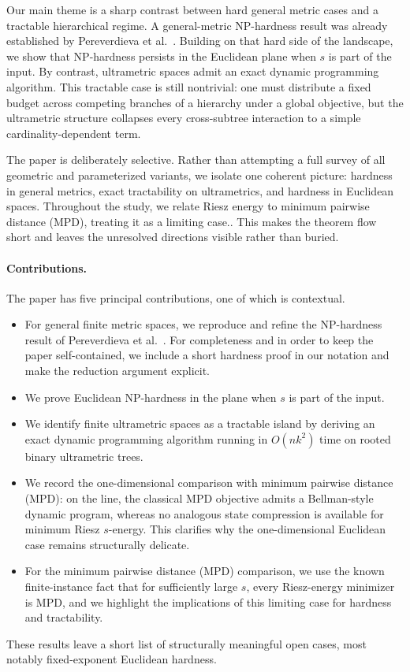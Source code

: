 \documentclass[11pt]{article}
\begin{document}
Our main theme is a sharp contrast between hard general metric cases and a tractable hierarchical regime. A general-metric NP-hardness result was already established by Pereverdieva et al.~\cite{PereverdievaEtAl2025}. Building on that hard side of the landscape, we show that NP-hardness persists in the Euclidean plane when $s$ is part of the input. By contrast, ultrametric spaces admit an exact dynamic programming algorithm. This tractable case is still nontrivial: one must distribute a fixed budget across competing branches of a hierarchy under a global objective, but the ultrametric structure collapses every cross-subtree interaction to a simple cardinality-dependent term.

The paper is deliberately selective. Rather than attempting a full survey of all geometric and parameterized variants, we isolate one coherent picture: hardness in general metrics, exact tractability on ultrametrics, and hardness in Euclidean spaces. Throughout the study, we relate Riesz energy to minimum pairwise distance (MPD), treating it as a limiting case.. This makes the theorem flow short and leaves the unresolved directions visible rather than buried.

\paragraph{Contributions.}
The paper has five principal contributions, one of which is contextual.
\begin{itemize}[leftmargin=1.5em]
\item For general finite metric spaces, we reproduce and refine the NP-hardness result of Pereverdieva et al.~\cite{PereverdievaEtAl2025}. For completeness and in order to keep the paper self-contained, we include a short hardness proof in our notation and make the reduction argument explicit.
\item We prove Euclidean NP-hardness in the plane when $s$ is part of the input.
\item We identify finite ultrametric spaces as a tractable island by deriving an exact dynamic programming algorithm running in $O(nk^2)$ time on rooted binary ultrametric trees.
\item We record the one-dimensional comparison with minimum pairwise distance (MPD): on the line, the classical MPD objective admits a Bellman-style dynamic program, whereas no analogous state compression is available for minimum Riesz $s$-energy. This clarifies why the one-dimensional Euclidean case remains structurally delicate.
\item For the minimum pairwise distance (MPD) comparison, we use the known finite-instance fact that for sufficiently large $s$, every Riesz-energy minimizer is MPD, and we highlight the implications of this limiting case for hardness and tractability.
\end{itemize}
These results leave a short list of structurally meaningful open cases, most notably fixed-exponent Euclidean hardness.
\end{document}
